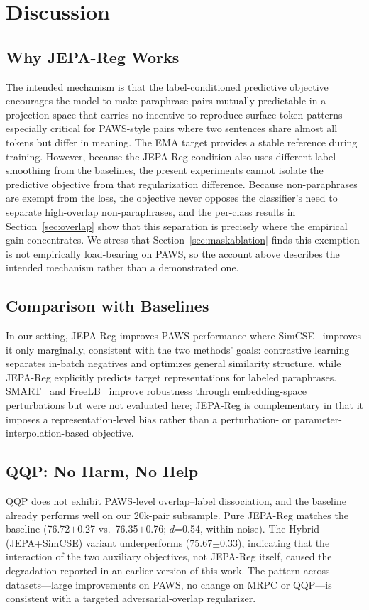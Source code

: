 \documentclass[sigconf]{acmart}
\begin{document}
\section{Discussion}

\subsection{Why JEPA-Reg Works}
The intended mechanism is that the label-conditioned predictive objective encourages the model to make paraphrase pairs mutually predictable in a projection space that carries no incentive to reproduce surface token patterns---especially critical for PAWS-style pairs where two sentences share almost all tokens but differ in meaning. The EMA target provides a stable reference during training. However, because the JEPA-Reg condition also uses different label smoothing from the baselines, the present experiments cannot isolate the predictive objective from that regularization difference. Because non-paraphrases are exempt from the loss, the objective never opposes the classifier's need to separate high-overlap non-paraphrases, and the per-class results in Section~\ref{sec:overlap} show that this separation is precisely where the empirical gain concentrates. We stress that Section~\ref{sec:maskablation} finds this exemption is not empirically load-bearing on PAWS, so the account above describes the intended mechanism rather than a demonstrated one.

\subsection{Comparison with Baselines}
In our setting, JEPA-Reg improves PAWS performance where SimCSE~\cite{gao2021simcse} improves it only marginally, consistent with the two methods' goals: contrastive learning separates in-batch negatives and optimizes general similarity structure, while JEPA-Reg explicitly predicts target representations for labeled paraphrases. SMART~\cite{jiang2020smart} and FreeLB~\cite{zhu2020freelb} improve robustness through embedding-space perturbations but were not evaluated here; JEPA-Reg is complementary in that it imposes a representation-level bias rather than a perturbation- or parameter-interpolation-based objective.

\subsection{QQP: No Harm, No Help}
\label{sec:qqp}
QQP does not exhibit PAWS-level overlap--label dissociation, and the baseline already performs well on our 20k-pair subsample. Pure JEPA-Reg matches the baseline (76.72$\pm$0.27 vs.\ 76.35$\pm$0.76; $d$=0.54, within noise). The Hybrid (JEPA+SimCSE) variant underperforms (75.67$\pm$0.33), indicating that the interaction of the two auxiliary objectives, not JEPA-Reg itself, caused the degradation reported in an earlier version of this work. The pattern across datasets---large improvements on PAWS, no change on MRPC or QQP---is consistent with a targeted adversarial-overlap regularizer.
\end{document}
